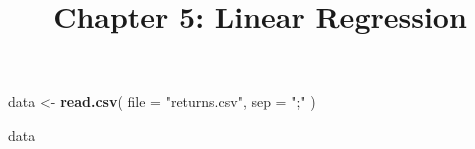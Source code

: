 \documentclass[
]{article}
\title{Chapter 5: Linear Regression}
\author{}
\date{\vspace{-2.5em}}
\newenvironment{Shaded}{\begin{snugshade}}{\end{snugshade}}
\newcommand{\AttributeTok}[1]{\textcolor[rgb]{0.13,0.29,0.53}{#1}}
\newcommand{\FunctionTok}[1]{\textcolor[rgb]{0.13,0.29,0.53}{\textbf{#1}}}
\newcommand{\NormalTok}[1]{#1}
\newcommand{\OtherTok}[1]{\textcolor[rgb]{0.56,0.35,0.01}{#1}}
\newcommand{\StringTok}[1]{\textcolor[rgb]{0.31,0.60,0.02}{#1}}
\begin{document}
\maketitle

\begin{Shaded}
\begin{Highlighting}[]
\NormalTok{data }\OtherTok{\textless{}{-}} \FunctionTok{read.csv}\NormalTok{(}
  \AttributeTok{file =} \StringTok{"returns.csv"}\NormalTok{,}
  \AttributeTok{sep =} \StringTok{";"}
\NormalTok{)}
\end{Highlighting}
\end{Shaded}

\begin{Shaded}
\begin{Highlighting}[]
\NormalTok{data}
\end{Highlighting}
\end{Shaded}
\end{document}
